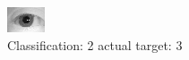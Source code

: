 \begin{figure}[h!]
\begin{center}
\includegraphics[width=0.60\columnwidth]{figures/ID1129_class_2_target_3.png}
\end{center}
\caption{ Classification: 2 actual target: 3}
\label{fig:ID1129_class_2_target_3}
\end{figure}
